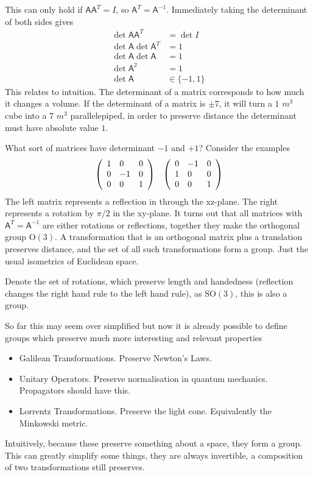 This can only hold if $\mathsf{A}\mathsf{A}^T=I$, so $\mathsf{A}^T = \mathsf{A}^{-1}$. Immediately taking the determinant of both sides gives
\begin{align*}
\det \mathsf{A}\mathsf{A}^T &= \det I \\
\det \mathsf{A} \det \mathsf{A}^T &= 1 \\
\det \mathsf{A} \det \mathsf{A} &= 1 \\
\det \mathsf{A}^2 &= 1 \\
\det \mathsf{A} &\in \{-1,1\}
\end{align*}
This relates to intuition. The determinant of a matrix corresponds to how much it changes a volume. If the determinant of a matrix is $\pm 7$, it will turn a $1$ $m^3$ cube into a $7$ $m^3$ parallelepiped, in order to preserve distance the determinant must have absolute value $1$.

What sort of matrices have determinant $-1$ and $+1$? Consider the examples
\begin{align*}
&\left( \begin{array}{l l l}
1 &0&0 \\
0&-1&0 \\
0&0&1
\end{array} \right) & \left( \begin{array}{l l l}
0&-1&0 \\
1&0&0 \\
0&0&1
\end{array} \right)
\end{align*}
The left matrix represents a reflection in through the xz-plane. The right represents a rotation by $\pi/2$ in the xy-plane. It turns out that all matrices with $\mathsf{A}^T = \mathsf{A}^{-1}$ are either rotations or reflections, together they make the orthogonal group $\mathrm{O}(3)$. A transformation that is an orthogonal matrix plus a translation preserves distance, and the set of all such transformations form a group. Just the usual isometrics of Euclidean space.

Denote the set of rotations, which preserve length and handedness (reflection changes the right hand rule to the left hand rule), as $\mathrm{SO}(3)$, this is also a group.

So far this may seem over simplified but now it is already possible to define groups which preserve much more interesting and relevant properties
\begin{itemize}
\item Galilean Transformations. Preserve Newton's Laws.
\item Unitary Operators. Preserve normalisation in quantum mechanics. Propagators should have this.
\item Lorrentz Transformations. Preserve the light cone. Equivalently the Minkowski metric.
\end{itemize}
Intuitively, because these preserve something about a space, they form a group. This can greatly simplify some things, they are always invertible, a composition of two transformations still preserves.

